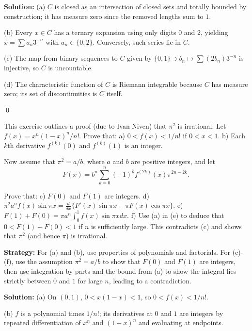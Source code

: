 \bigskip\noindent\textbf{Solution:}
(a) $C$ is closed as an intersection of closed sets and totally bounded by construction; it has measure zero since the removed lengths sum to $1$.

(b) Every $x\in C$ has a ternary expansion using only digits $0$ and $2$, yielding $x=\sum a_n 3^{-n}$ with $a_n\in\{0,2\}$. Conversely, such series lie in $C$.

(c) The map from binary sequences to $C$ given by $\{0,1\}\ni b_n\mapsto \sum (2b_n)3^{-n}$ is injective, so $C$ is uncountable.

(d) The characteristic function of $C$ is Riemann integrable because $C$ has measure zero; its set of discontinuities is $C$ itself.




\qed
\begin{problembox}[7.33: Irrationality of $\pi^2$]
\begin{problemstatement}
This exercise outlines a proof (due to Ivan Niven) that $\pi^2$ is irrational. Let $f(x) = x^n(1 - x)^n/n!$. Prove that:
a) $0 < f(x) < 1/n!$ if $0 < x < 1$.
b) Each $k$th derivative $f^{(k)}(0)$ and $f^{(k)}(1)$ is an integer.

Now assume that $\pi^2 = a/b$, where $a$ and $b$ are positive integers, and let
\[F(x) = b^n \sum_{k=0}^{n} (-1)^k f^{(2k)}(x) \pi^{2n-2k}.\]

Prove that:
c) $F(0)$ and $F(1)$ are integers.
d) $\pi^2 a^n f(x) \sin \pi x = \frac{d}{dx} \{ F'(x) \sin \pi x - \pi F(x) \cos \pi x \}$.
e) $F(1) + F(0) = \pi a^n \int_{0}^{1} f(x) \sin \pi x dx$.
f) Use (a) in (e) to deduce that $0 < F(1) + F(0) < 1$ if $n$ is sufficiently large. This contradicts (c) and shows that $\pi^2$ (and hence $\pi$) is irrational.
\end{problemstatement}
\end{problembox}

\noindent\textbf{Strategy:} For (a) and (b), use properties of polynomials and factorials. For (c)-(f), use the assumption $\pi^2 = a/b$ to show that $F(0)$ and $F(1)$ are integers, then use integration by parts and the bound from (a) to show the integral lies strictly between $0$ and $1$ for large $n$, leading to a contradiction.

\bigskip\noindent\textbf{Solution:}
(a) On $(0,1)$, $0<x(1-x)<1$, so $0<f(x)<1/n!$.

(b) $f$ is a polynomial times $1/n!$; its derivatives at $0$ and $1$ are integers by repeated differentiation of $x^n$ and $(1-x)^n$ and evaluating at endpoints.

